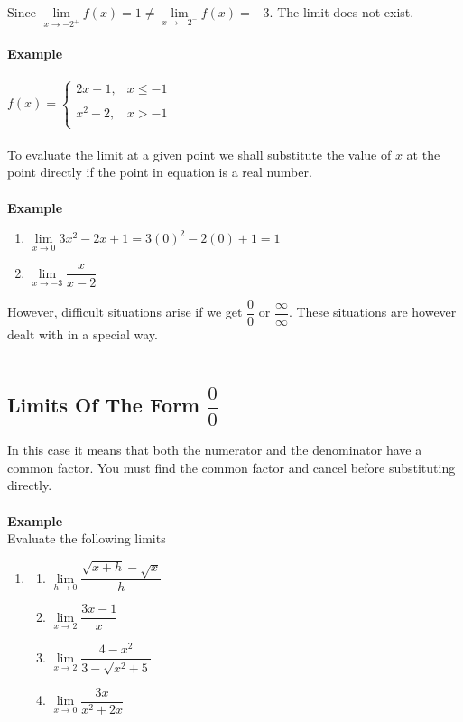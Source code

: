 \documentclass[11pt,a4paper]{article}
\begin{document}
Since $\lim\limits_{x\longrightarrow -2^+}f(x)=1\neq \lim\limits_{x\longrightarrow -2^-}f(x)=-3.$ The limit does not exist.\\\\



\textbf{Example}\\\\
$f(x)=
\begin{cases}
2x+1, & x\leq -1\\\\
x^2-2, & x>-1\\
\end{cases}
$\\\\

To evaluate the limit at a given point we shall substitute the value of $x$ at the point directly if the point in equation is a real number.\\\\

\textbf{Example}
\begin{enumerate}
\item $\lim\limits_{x\longrightarrow 0} 3x^2-2x+1=3(0)^2-2(0)+1=1$
\item $\lim\limits_{x\longrightarrow -3}\dfrac{x}{x-2}$\\
\end{enumerate}

However, difficult situations arise if we get $\dfrac{0}{0}$ or $\dfrac{\infty}{\infty}$. These situations are however dealt with in a special way.\\\\








\subsection{Limits Of The Form $\dfrac{0}{0}$}
In this case it means that both the numerator and the denominator have a common factor. You must find the common factor and cancel before substituting directly.\\\\

\textbf{Example}\\
Evaluate the following limits
\begin{enumerate}
\item[]
\begin{enumerate}
        \item $\lim\limits_{h\longrightarrow 0}\dfrac{\sqrt{x+h}-\sqrt{x}}{h}$
        \item $\lim\limits_{x\longrightarrow 2}\dfrac{3x-1}{x}$
        \item $\lim\limits_{x\longrightarrow 2}\dfrac{4-x^2}{3-\sqrt{x^2+5}}$
        \item $\lim\limits_{x\longrightarrow 0}\dfrac{3x}{x^2+2x}$\\
\end{enumerate}
\end{enumerate}
\end{document}
